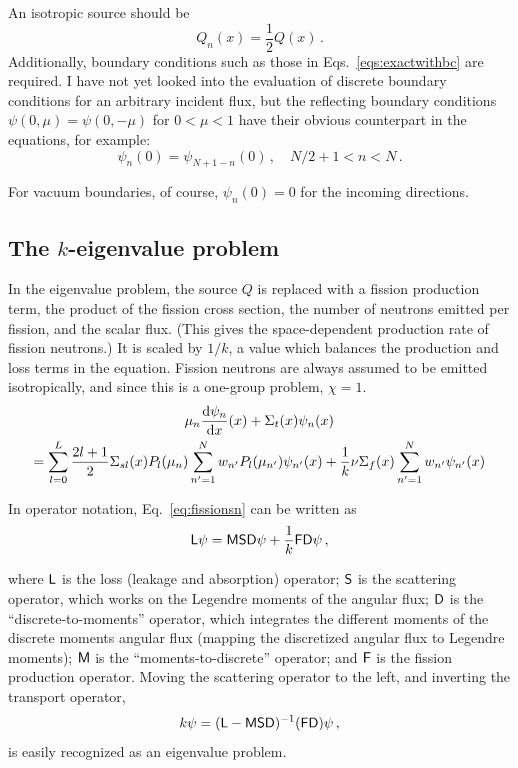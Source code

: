 \documentclass[11pt]{article}
\begin{document}
An isotropic source should be 
\begin{equation}
Q_n(x) = \frac{1}{2} Q(x) \,.
  \label{eq:isotropicsource}
\end{equation}
Additionally, boundary conditions such as those in
Eqs.~\eqref{eqs:exactwithbc} are required. I have not yet looked into the
evaluation of discrete boundary conditions for an arbitrary incident flux, but
the reflecting boundary conditions $\psi(0, \mu) = \psi(0, -\mu)$ for $0 < \mu
< 1$ have their obvious counterpart in the \SN{} equations, for example:
$$ \psi_{n}(0) = \psi_{N + 1 - n}(0) \,, \quad N/2 + 1 < n < N  \,.$$

For vacuum boundaries, of course, $\psi_{n}(0) = 0$ for the incoming directions.
\subsection{The $k$-eigenvalue problem}
In the eigenvalue problem, the source $Q$ is replaced with a fission production
term, the product of the fission cross section, the number of neutrons emitted
per fission, and the scalar flux. (This gives the space-dependent production
rate of fission neutrons.)
It is scaled by $1/k$, a value which balances the production and loss
terms in the equation. Fission neutrons are always assumed to be emitted
isotropically, and since this is a one-group problem, $\chi = 1$. 
\begin{multline}
  \mu_n \frac{\mathrm{d} \psi_n}{\mathrm{d} x}(x) + \Sigma_t(x) \psi_n(x) 
\\
  = \sum_{l=0}^{L}  \frac{2l+1}{2} \Sigma_{sl}(x) P_{l}(\mu_n)
  \sum_{n'=1}^{N} w_{n'} P_{l} (\mu_{n'}) \psi_{n'}(x)
  + \frac{1}{k} \nu\Sigma_f(x) \sum_{n'=1}^{N} w_{n'} \psi_{n'}(x)
  \label{eq:fissionsn}
\end{multline}

In operator notation, Eq.~\eqref{eq:fissionsn} can be
written as
\begin{equation}
\mathsf{L} \psi = \mathsf{M} \mathsf{S} \mathsf{D} \psi +  \frac{1}{k} \mathsf{F} \mathsf{D} \psi \,,
  \label{eq:fissionoperator}
\end{equation}

where $\mathsf{L}$ is the loss (leakage and absorption) operator; 
$\mathsf{S}$ is the scattering operator, which works on the Legendre moments of
the angular flux; $\mathsf{D}$ is the ``discrete-to-moments'' operator, which
integrates
the different moments of the discrete moments angular flux (mapping the
discretized angular flux to Legendre moments); $\mathsf{M}$ is the
``moments-to-discrete'' operator; and $\mathsf{F}$ is the
fission production operator. Moving the scattering operator to the left, and
inverting the transport operator,
$$ k \psi = (\mathsf{L} - \mathsf{M} \mathsf{S} \mathsf{D} )^{-1}  (\mathsf{F} \mathsf{D}) \psi \,,$$
is easily recognized as an eigenvalue problem.
\end{document}
